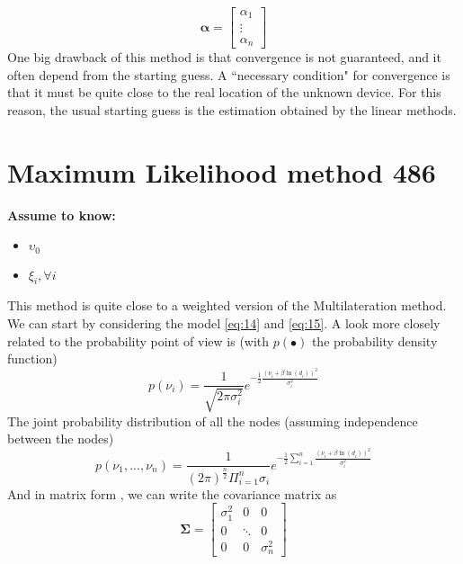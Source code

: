 \documentclass[12pt,twoside]{report}
\begin{document}
\begin{equation}
    \boldsymbol{\alpha}=\begin{bmatrix}
    \alpha_1\\
    \vdots\\
    \alpha_n
    \end{bmatrix}
\end{equation}
One big drawback of this method is that convergence is not guaranteed, and it often depend from the starting guess. A ``necessary condition" for convergence is that it must be quite close to the real location of the unknown device. For this reason, the usual starting guess is the estimation obtained by the linear methods.
\clearpage


\section{Maximum Likelihood method 486}
  \begin{center}
  \textbf{Assume to know:}
  \begin{itemize}
    \centering
    \item $\upsilon_0$
    \item $\xi_i,\forall i$
  \end{itemize}
  \end{center}
This method is quite close to a weighted version of the Multilateration method. We can start by considering the model \ref{eq:14} and \ref{eq:15}.
A look more closely related to the probability point of view is (with $p(\bullet)$ the probability density function)
\begin{equation}
    p(\nu_i)=\frac{1}{\sqrt{2\pi\sigma^2_i}}e^{-\frac{1}{2}\frac{(\nu_i+\beta\ln(d_i))^2}{\sigma^2_i}}
\end{equation}
The joint probability distribution of all the nodes (assuming independence between the nodes) \begin{equation}
    p(\nu_1,...,\nu_n)=\frac{1}{(2\pi)^{\frac{n}{2}}\Pi_{i=1}^n\sigma_i}e^{-\frac{1}{2}\sum_{i=1}^n\frac{(\nu_i+\beta\ln(d_i))^2}{\sigma^2_i}}
\end{equation}
And in matrix form \cite{rzk}, we can write the covariance matrix as 
\begin{equation}
    \boldsymbol{\Sigma}=\begin{bmatrix}
    \sigma^2_1 & 0 & 0\\
    0 &\ddots& 0\\
    0&0&\sigma^2_n
    \end{bmatrix}
\end{equation}
\end{document}

